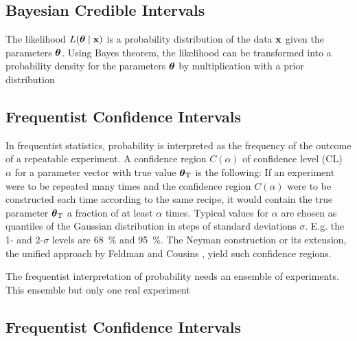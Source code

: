 \subsection{Bayesian Credible Intervals}
The likelihood $L\giventhat{\paramVec}{\dataVec}$ is a probability distribution of the data $\boldsymbol{\mathbf{x}}$ given the parameters $\boldsymbol{\mathbf{\theta}}$. Using Bayes theorem, the likelihood can be transformed into a probability density for the parameters $\boldsymbol{\mathbf{\theta}}$ by multiplication with a prior distribution 


\subsection{Frequentist Confidence Intervals}
In frequentist statistics, probability is interpreted as the frequency
of the outcome of a repeatable experiment. A confidence region $C(\alpha)$ of confidence level (CL) $\alpha$ for a parameter vector with true value $\boldsymbol{\mathbf{\theta}}_\mathrm{T}$ is the following: If an experiment were to be repeated many times and the confidence region $C(\alpha)$ were to be constructed each time according to the same recipe, it would contain the true parameter $\boldsymbol{\mathbf{\theta}}_\mathrm{T}$ a fraction of at least $\alpha$ times. Typical values for $\alpha$ are chosen as quantiles of the Gaussian distribution in steps of standard deviations $\sigma$. E.g. the 1- and 2-$\sigma$ levels are \SI{68}{\percent} and \SI{95}{\percent}. The Neyman construction \cite{Neyman1937} or its extension, the unified approach by Feldman and Cousins \cite{Feldman1998}, yield such confidence regions. 


The frequentist interpretation of probability needs an ensemble of experiments. This ensemble  but only one real experiment 

\subsection{Frequentist Confidence Intervals}




